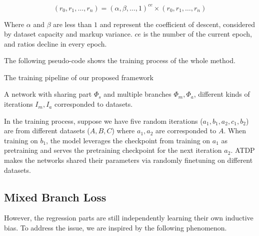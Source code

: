 \documentclass[journal,transmag]{IEEEtran}
\begin{document}
\begin{equation}
\label{equation:ratiosDecline}
   (r_0, r_1, \dots, r_n) = (\alpha,\beta,\dots,1)^{ce} \times (r_0, r_1, \dots, r_n)
\end{equation}

Where $\alpha$ and $\beta$ are less than $1$ and represent the coefficient of descent, considered by dataset capacity and markup variance.
$ce$ is the number of the current epoch, and ratios decline in every epoch. 

The following pseudo-code shows the training process of the whole method.


\begin{algorithm}[tbh]
\caption{The training pipeline of our proposed framework}
\label{alg:ATF}
\begin{algorithmic}[1]
\Require
A network with sharing part $\Phi_s$ and multiple branches $\Phi_m , \Phi_a$,  different kinds of iterations $I_m,I_a$ corresponded to datasets.
   \EndWhile

\EndFor
\end{algorithmic}

\end{algorithm}


In the training process, suppose we have five random iterations ($a_1,b_1,a_2,c_1,b_2$) are from different datasets ($A,B,C$) where $a_1,a_2$ are corresponded to $A$.
When training on $b_1$, the model leverages the checkpoint from training on $a_1$ as pretraining and serves the pretraining checkpoint for the next iteration $a_2$.
ATDP makes the networks shared their parameters via randomly finetuning on different datasets.

\subsection{Mixed Branch Loss}
\label{subsec:MBL}

However, the regression parts are still independently learning their own inductive bias. 
To address the issue, we are inspired by the following phenomenon.
\end{document}
